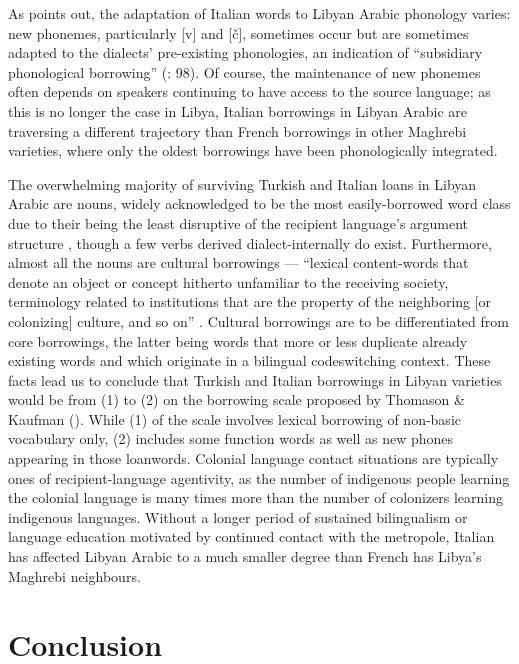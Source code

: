 \documentclass[output=paper]{langsci/langscibook}
\begin{document}
  As \citet{Danna2018phonetic} points out, the adaptation of Italian words to Libyan Arabic phonology varies: new phonemes, particularly  [v] and [č], sometimes occur but are sometimes adapted to the dialects’ pre-existing phonologies, an indication of “subsidiary phonological borrowing” (\citealt{VanCoetsem1988}: 98). Of course, the maintenance of new phonemes often depends on speakers continuing to have access to the source language; as this is no longer the case in Libya, Italian borrowings in Libyan Arabic are traversing a different trajectory than French borrowings in other Maghrebi varieties, where only the oldest borrowings have been phonologically integrated.

  The overwhelming majority of surviving Turkish and Italian loans in Libyan Arabic are nouns, widely acknowledged to be the most easily-borrowed word class due to their being the least disruptive of the recipient language’s argument structure \citep{Myers-Scotton2002}, though a few verbs derived dialect-internally do exist. Furthermore, almost all the nouns are cultural borrowings — “lexical content-words that denote an object or concept hitherto unfamiliar to the receiving society, terminology related to institutions that are the property of the neighboring [or colonizing] culture, and so on” \citep[210]{Matras2011universals}. Cultural borrowings are to be differentiated from core borrowings, the latter being words that more or less duplicate already existing words and which originate in a bilingual codeswitching context. These facts lead us to conclude that Turkish and Italian borrowings in Libyan varieties would be from (1) to (2) on the borrowing scale proposed by Thomason \& Kaufman (\citeyear[78–83]{ThomasonKaufman1988}). While (1) of the scale involves lexical borrowing of non-basic vocabulary only, (2) includes some function words as well as new phones appearing in those loanwords. Colonial language contact situations are typically ones of recipient-language agentivity, as the number of indigenous people learning the colonial language is many times more than the number of colonizers learning indigenous languages. Without a longer period of sustained bilingualism or language education motivated by continued contact with the metropole, Italian has affected Libyan Arabic to a much smaller degree than French has Libya's Maghrebi neighbours.

\section{Conclusion}
\end{document}
